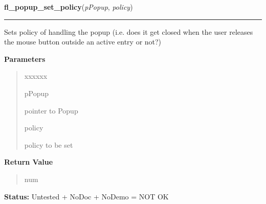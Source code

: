 \hspace{.8\funcindent}\begin{boxedminipage}{\funcwidth}

    \raggedright \textbf{fl\_popup\_set\_policy}(\textit{pPopup}, \textit{policy})

    \vspace{-1.5ex}

    \rule{\textwidth}{0.5\fboxrule}
\setlength{\parskip}{2ex}
    Sets policy of handling the popup (i.e. does it get closed when the 
    user releases the mouse button outside an active entry or not?)

\setlength{\parskip}{1ex}
      \textbf{Parameters}
      \vspace{-1ex}

      \begin{quote}
        \begin{Ventry}{xxxxxx}

          \item[pPopup]

          pointer to Popup

          \item[policy]

          policy to be set

        \end{Ventry}

      \end{quote}

      \textbf{Return Value}
    \vspace{-1ex}

      \begin{quote}
      num

      \end{quote}

\textbf{Status:} Untested + NoDoc + NoDemo = NOT OK



    \end{boxedminipage}

    \label{xformslib:library:fl_popup_set_callback}

    \vspace{0.5ex}


